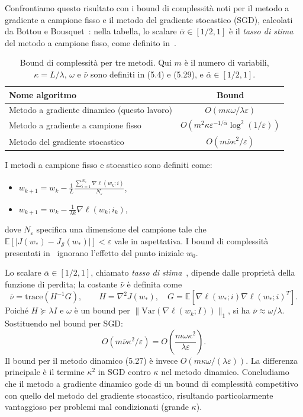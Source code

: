 \documentclass[italian, a4paper, twoside, binding=6mm]{sapthesis}
\begin{document}
Confrontiamo questo risultato con i bound di complessità noti per il metodo a gradiente a campione fisso e il metodo del gradiente stocastico (SGD), calcolati da Bottou e Bousquet~\cite{bottou2008}: nella tabella, lo scalare $\bar{\alpha} \in [1/2, 1]$ è il \textit{tasso di stima} del metodo a campione fisso, come definito in~\cite{bottou2008}.
\begin{table}[h]
\centering
\begin{tabular}{|l|c|}
\hline
Nome algoritmo & Bound \\
\hline
Metodo a gradiente dinamico (questo lavoro) & \(O(m\kappa \omega / \lambda \varepsilon)\) \\
Metodo a gradiente a campione fisso & \(O(m^2 \kappa\varepsilon^{-1/\bar{\alpha}} \log^2(1/\varepsilon))\) \\
Metodo del gradiente stocastico & \(O(m\bar{\nu}\kappa^2 / \varepsilon)\) \\
\hline
\end{tabular}
\caption{Bound di complessità per tre metodi. Qui \(m\) è il numero di variabili, \(\kappa = L/\lambda\), \(\omega\) e \(\bar{\nu}\) sono definiti in (5.4) e (5.29), e \(\bar{\alpha} \in [1/2, 1]\).}
\end{table}

I metodi a campione fisso e stocastico sono definiti come:
\begin{itemize}
  \item {} \(w_{k+1} = w_k - \frac{1}{L} \frac{\sum_{i=1}^{N_\varepsilon} \nabla \ell(w_k;i)}{N_\varepsilon}\),
  \item {} \(w_{k+1} = w_k - \frac{1}{\lambda k} \nabla \ell(w_k; i_k)\),
\end{itemize}
dove \(N_\varepsilon\) specifica una dimensione del campione tale che \(\mathbb{E}[|J(w_*) - J_{\mathcal{S}}(w_*)|] < \varepsilon\) vale in aspettativa. I bound di complessità presentati in~\cite{bottou2008} ignorano l'effetto del punto iniziale \(w_0\).

Lo scalare \(\bar{\alpha} \in [1/2, 1]\), chiamato \textit{tasso di stima}~\cite{bottou2008}, dipende dalle proprietà della funzione di perdita; la costante \(\bar{\nu}\) è definita come
\[
\bar{\nu} = \mathrm{trace}(H^{-1}G), \qquad H = \nabla^2 J(w_*), \quad G = \mathbb{E}[\nabla \ell(w_*; i) \nabla \ell(w_*; i)^T]. \tag{5.29}
\]
Poiché \(H \succeq \lambda I\) e \(\omega\) è un bound per \(\|\mathrm{Var}(\nabla \ell(w_k;I))\|_1\), si ha \(\bar{\nu} \approx \omega/\lambda\). Sostituendo nel bound per SGD:
\[
O(m\bar{\nu}\kappa^2/\varepsilon) = O\!\left(\frac{m \omega \kappa^2}{\lambda \varepsilon}\right). \tag{5.30}
\]
Il bound per il metodo dinamico (5.27) è invece \(O(m\kappa\omega/(\lambda\varepsilon))\). La differenza principale è il termine \(\kappa^2\) in SGD contro \(\kappa\) nel metodo dinamico. Concludiamo che il metodo a gradiente dinamico gode di un bound di complessità competitivo con quello del metodo del gradiente stocastico, risultando particolarmente vantaggioso per problemi mal condizionati (grande \(\kappa\)).
\end{document}

